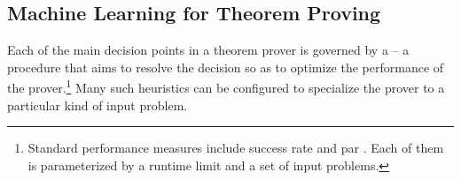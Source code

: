 
\subsection{Machine Learning for Theorem Proving}



Each of the main decision points in a theorem prover is governed by a  -- a procedure that aims to resolve the decision so as to optimize the performance of the prover.\footnote{Standard performance measures include success rate and \gls{par} \cite{DBLP:journals/ai/BischlKKLMFHHLT16}. Each of them is parameterized by a runtime limit and a set of input problems.}
Many such heuristics can be configured to specialize the prover to a particular kind of input problem.

